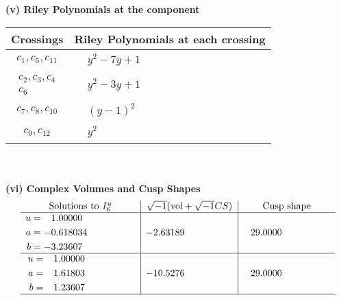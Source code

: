 \documentclass[1p]{elsarticle_modified}
\theoremstyle{definition}
\newcommand{\I}{\sqrt{-1}}
\begin{document}
\newpage\renewcommand{\arraystretch}{1}
\flushleft \textbf{(v) Riley Polynomials at the component}\newline \\
\begin{tabular}{m{50pt}|m{274pt}}
Crossings & \hspace{64pt}Riley Polynomials at each crossing \\
\hline $$\begin{aligned}c_{1},c_{5},c_{11}\end{aligned}$$&$\begin{aligned}
&y^2-7 y+1
\end{aligned}$\\
\hline $$\begin{aligned}c_{2},c_{3},c_{4}\\c_{6}\end{aligned}$$&$\begin{aligned}
&y^2-3 y+1
\end{aligned}$\\
\hline $$\begin{aligned}c_{7},c_{8},c_{10}\end{aligned}$$&$\begin{aligned}
&(y-1)^2
\end{aligned}$\\
\hline $$\begin{aligned}c_{9},c_{12}\end{aligned}$$&$\begin{aligned}
&y^2
\end{aligned}$\\
\hline
\end{tabular}\\~\\
\newpage\flushleft \textbf{(vi) Complex Volumes and Cusp Shapes}
$$\begin{array}{c|c|c}  
\text{Solutions to }I^u_{6}& \I (\text{vol} + \sqrt{-1}CS) & \text{Cusp shape}\\
 \hline 
\begin{aligned}
u &= \phantom{-}1.00000\phantom{ +0.000000I} \\
a &= -0.618034\phantom{ +0.000000I} \\
b &= -3.23607\phantom{ +0.000000I}\end{aligned}
 & -2.63189\phantom{ +0.000000I} & \phantom{-}29.0000\phantom{ +0.000000I} \\ \hline\begin{aligned}
u &= \phantom{-}1.00000\phantom{ +0.000000I} \\
a &= \phantom{-}1.61803\phantom{ +0.000000I} \\
b &= \phantom{-}1.23607\phantom{ +0.000000I}\end{aligned}
 & -10.5276\phantom{ +0.000000I} & \phantom{-}29.0000\phantom{ +0.000000I}\\
 \hline 
 \end{array}$$\newpage
\end{document}
